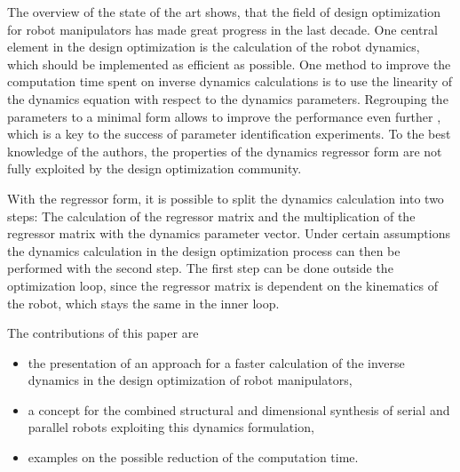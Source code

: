 \documentclass{svproc}
\begin{document}
The overview of the state of the art shows, that the field of design optimization for robot manipulators has made great progress in the last decade.
One central element in the design optimization is the calculation of the robot dynamics, which should be implemented as efficient as possible.
One method to improve the computation time spent on inverse dynamics calculations is to use the linearity of the dynamics equation with respect to the dynamics parameters.
Regrouping the parameters to a minimal form allows to improve the performance even further \cite{KhalilDom2002}, which is a key to the success of parameter identification experiments.
To the best knowledge of the authors, the properties of the dynamics regressor form are not fully exploited by the design optimization community.

With the regressor form, it is possible to split the dynamics calculation into two steps: The calculation of the regressor matrix and the  multiplication of the regressor matrix with the dynamics parameter vector.
Under certain assumptions the dynamics calculation in the design optimization process can then be performed with the second step.
The first step can be done outside the optimization loop, since the regressor matrix is dependent on the kinematics of the robot, which stays the same in the inner loop.

The contributions of this paper are
\begin{itemize}
    \item the presentation of an approach for a faster calculation of the inverse dynamics in the design optimization of robot manipulators,
    \item a concept for the combined structural and dimensional synthesis of serial and parallel robots exploiting this dynamics formulation,
    \item examples on the possible reduction of the computation time.
\end{itemize}
\end{document}
